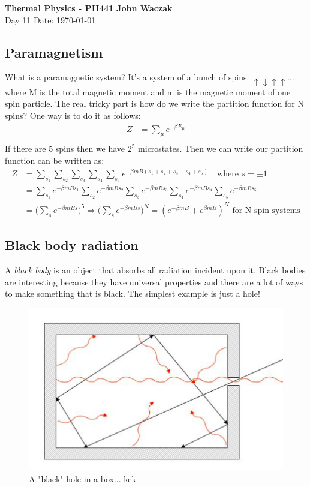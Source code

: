 \documentclass[a4paper, 11pt]{article}
\begin{document}
\noindent
\large\textbf{Thermal Physics - PH441} \hfill \textbf{John Waczak} \\
\normalsize Day 11 \hfill  Date: \today \\

\subsection*{Paramagnetism}
	What is a paramagnetic system? It's a system of a bunch of spins: $\uparrow \downarrow \uparrow \uparrow ...$ where M is the total magnetic moment and m is the magnetic moment of one spin particle. The real tricky part is how do we write the partition function for N spins? One way is to do it as follows: 
		\begin{align*}
			Z &= \sum_\mu e^{-\beta E_\mu} \\ 
		\end{align*}
	If there are 5 spins then we have $2^5$ microstates. Then we can write our partition function can be written as: 
		\begin{align*}
			Z &= \sum_{s_1} \sum_{s_2} \sum_{s_3}\sum_{s_4}\sum_{s_5} e^{-\beta m B(s_1+s_2+s_3+s_4+s_5)} \quad \text{where } s = \pm 1 \\ 
				&= \sum_{s_1}e^{-\beta m B s_1} \sum_{s_2} e^{-\beta m B s_2}\sum_{s_3}e^{-\beta m B s_3}\sum_{s_4}e^{-\beta m B s_4}\sum_{s_5}e^{-\beta m B s_5} \\ 
				&= \Big(\sum_{s}e^{-\beta m B s}\Big)^5 \Rightarrow \Big(\sum_{s}e^{-\beta m B s}\Big)^N = (e^{-\beta m B}+e^{\beta m B})^N \text{ for N spin systems} 
		\end{align*} 
	
\subsection*{Black body radiation} 
	A \textit{black body} is an object that absorbs all radiation incident upon it. Black bodies are interesting because they have universal properties and there are a lot of ways to make something that is black. The simplest example is just a hole! 
		\begin{figure}[!hbt]
			\centering 
			\includegraphics[width=0.35\columnwidth]{blackBody}
			\caption{A "black" hole in a box... kek}
		\end{figure}
	
\end{document}
